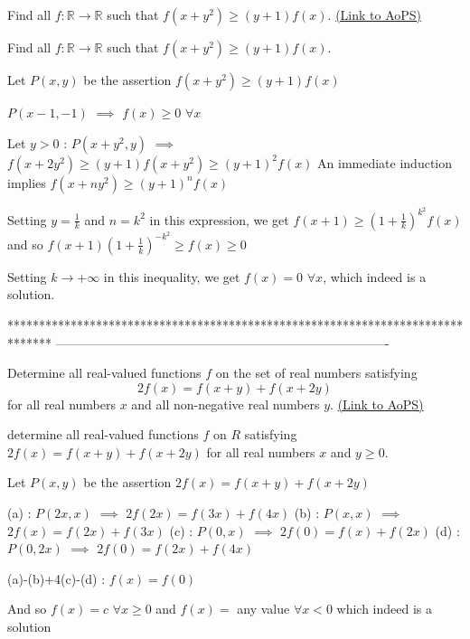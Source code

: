 \begin{problem}
	Find all $ f:\mathbb{R}\rightarrow\mathbb{R} $ such that $f(x+y^{2}) \geq (y+1)f(x)$.
	\flushright \href{https://artofproblemsolving.com/community/c6h459629}{(Link to AoPS)}
\end{problem}



\begin{solution}
	\begin{tcolorbox}Find all $ f:\mathbb{R}\rightarrow\mathbb{R} $ such that $f(x+y^{2}) \geq (y+1)f(x)$.\end{tcolorbox}
Let $P(x,y)$ be the assertion $f(x+y^2)\ge(y+1)f(x)$

$P(x-1,-1)$ $\implies$ $f(x)\ge 0$ $\forall x$

Let $y>0$ : $P(x+y^2,y)$ $\implies$ $f(x+2y^2)\ge (y+1)f(x+y^2)\ge (y+1)^2f(x)$
An immediate induction implies $f(x+ny^2)\ge (y+1)^nf(x)$

Setting $y=\frac 1k$ and $n=k^2$ in this expression, we get $f(x+1)\ge(1+\frac 1k)^{k^2}f(x)$ and so $f(x+1)(1+\frac 1k)^{-k^2}\ge f(x)\ge 0$

Setting $k\to+\infty$ in this inequality, we get $\boxed{f(x)=0}$ $\forall x$, which indeed is a solution.
\end{solution}
*******************************************************************************
-------------------------------------------------------------------------------

\begin{problem}
	Determine all real-valued functions $f$ on the set of real numbers satisfying
\[2f(x)=f(x+y)+f(x+2y)\]
for all real numbers $x$ and all non-negative real numbers $y$.
	\flushright \href{https://artofproblemsolving.com/community/c6h462017}{(Link to AoPS)}
\end{problem}



\begin{solution}
	\begin{tcolorbox}determine all real-valued functions $f$ on $R$ satisfying
$2f(x)=f(x+y)+f(x+2y)$
for all real numbers $x$ and $y\ge 0$.\end{tcolorbox}
Let $P(x,y)$ be the assertion $2f(x)=f(x+y)+f(x+2y)$

(a) : $P(2x,x)$ $\implies$ $2f(2x)=f(3x)+f(4x)$
(b) : $P(x,x)$ $\implies$ $2f(x)=f(2x)+f(3x)$
(c) : $P(0,x)$ $\implies$ $2f(0)=f(x)+f(2x)$
(d) : $P(0,2x)$ $\implies$ $2f(0)=f(2x)+f(4x)$

(a)-(b)+4(c)-(d) : $f(x)=f(0)$

And so $\boxed{f(x)=c}$ $\forall x\ge 0$ and $f(x)=$ any value $\forall x<0$ which indeed is a solution
\end{solution}




